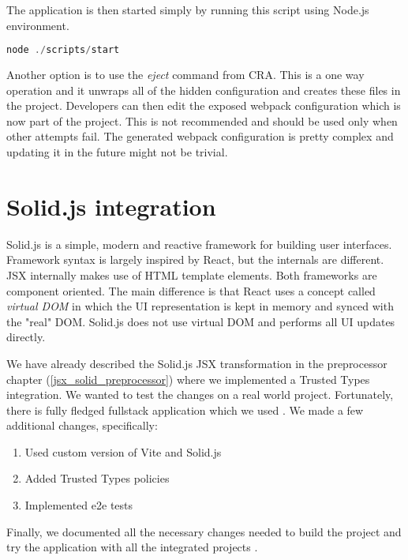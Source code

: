 The application is then started simply by running this script using Node.js environment.

\bigskip
\begin{lstlisting}[language=JavaScript, caption=Starting the CRA application]
node ./scripts/start
\end{lstlisting}

Another option is to use the \emph{eject} command from CRA. This is a one way operation and it
unwraps all of the hidden configuration and creates these files in the project. Developers can then
edit the exposed webpack configuration which is now part of the project. This is not recommended and
should be used only when other attempts fail. The generated webpack configuration is pretty complex
and updating it in the future might not be trivial.

\section{Solid.js integration}
\label{section:solid}

Solid.js is a simple, modern and reactive framework for building user interfaces. Framework
syntax is largely inspired by React, but the internals are different. JSX internally makes use of
HTML template elements. Both frameworks are component oriented. The main difference is that React
uses a concept called \emph{virtual DOM} in which the UI representation is kept in memory and synced
with the "real" DOM. Solid.js does not use virtual DOM and performs all UI updates directly.

We have already described the Solid.js JSX transformation in the preprocessor chapter
(\ref{jsx_solid_preprocessor}) where we implemented a Trusted Types integration. We wanted to test
the changes on a real world project. Fortunately, there is fully fledged fullstack application which
we used \cite{original_solid_realworld_project}. We made a few additional changes, specifically:

\begin{enumerate}
  \item Used custom version of Vite and Solid.js
  \item Added Trusted Types policies
  \item Implemented e2e tests
\end{enumerate}

Finally, we documented all the necessary changes needed to build the project and try the application
with all the integrated projects \cite{solid_realworld_project:readme}.

